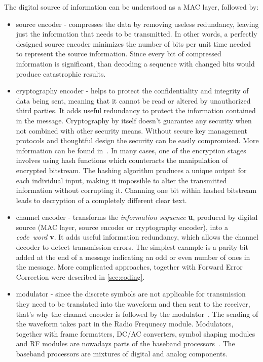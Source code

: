 The digital source of information can be understood as a MAC layer, followed by:
\begin{itemize}
    \item source encoder - compresses the data by removing useless redundancy, leaving just the information that needs to be transmitted. In other words, a perfectly designed source encoder minimizes the number of bits per unit time needed to represent the source information. Since every bit of compressed information is significant, than decoding a sequence with changed bits would produce catastrophic results.
    \item cryptography encoder - helps to protect the confidentiality and integrity of data being sent, meaning that it cannot be read or altered by unauthorized third parties. It adds useful redundancy to protect the information contained in the message. Cryptography by itself doesn't guarantee any security when not combined with other security means. Without secure key management protocols and thoughtful design the security can be easily compromised. More information can be found in~\cite{Cryptography}. In many cases, one of the encryption stages involves using hash functions which counteracts the manipulation of encrypted bitstream. The hashing algorithm produces a unique output for each individual input, making it impossible to alter the transmitted information without corrupting it. Channing one bit within hashed bitstream leads to decryption of a completely different clear text.
    \item channel encoder - transforms the \textit{information sequence} \textbf{u}, produced by digital source (MAC layer, source encoder or cryptography encoder), into a \textit{code~word} \textbf{v}. It adds useful information redundancy, which allows the channel decoder to detect transmission errors. The simplest example is a parity bit added at the end of a message indicating an odd or even number of ones in the message. More complicated approaches, together with Forward Error Correction were described in \autoref{sec:coding}.
    \item modulator - since the discrete symbols are not applicable for transmission they need to be translated into the waveform and then sent to the receiver, that's why the channel encoder is followed by the modulator~\cite{book:LinCostello}. The sending of the waveform takes part in the Radio Frequnecy module. Modulators, together with frame formatters, DC/AC converters, symbol shaping modules and RF modules are nowadays parts of the baseband processors~\cite{book:Ismail}. The baseband processors are mixtures of digital and analog components.
\end{itemize}

